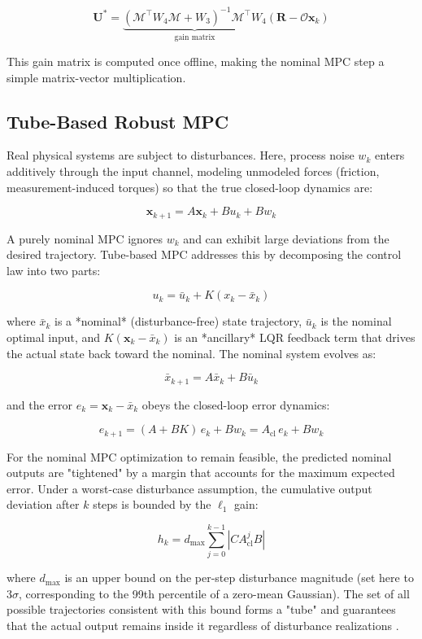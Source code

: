 \documentclass[11pt]{article}
\begin{document}
$$\mathbf{U}^* = \underbrace{({\mathcal{M}}^\top W_4 \mathcal{M} + W_3)^{-1} \mathcal{M}^\top W_4}_{\text{gain matrix}} \left( \mathbf{R} - \mathcal{O}\mathbf{x}_k \right)$$

This gain matrix is computed once offline, making the nominal MPC step a simple matrix-vector multiplication.

\subsection{Tube-Based Robust MPC}
Real physical systems are subject to disturbances. Here, process noise $w_k$ enters additively through the input channel, modeling unmodeled forces (friction, measurement-induced torques) so that the true closed-loop dynamics are:

$$\mathbf{x}_{k+1} = A\mathbf{x}_k + Bu_k + Bw_k$$

A purely nominal MPC ignores $w_k$ and can exhibit large deviations from the desired trajectory. Tube-based MPC addresses this by decomposing the control law into two parts:

$$u_k = \bar{u}_k + K(x_k - \bar{x}_k)$$

where $\bar{x}_k$ is a *nominal* (disturbance-free) state trajectory, $\bar{u}_k$ is the nominal optimal input, and $K(\mathbf{x}_k - \bar{x}_k)$ is an *ancillary* LQR feedback term that drives the actual state back toward the nominal. The nominal system evolves as:

$$\bar{x}_{k+1} = A\bar{x}_k + B\bar{u}_k$$

and the error $e_k = \mathbf{x}_k - \bar{x}_k$ obeys the closed-loop error dynamics:

$$e_{k+1} = (A + BK)\,e_k + Bw_k = A_{\text{cl}}\,e_k + Bw_k$$

For the nominal MPC optimization to remain feasible, the predicted nominal outputs are "tightened" by a margin that accounts for the maximum expected error. Under a worst-case disturbance assumption, the cumulative output deviation after $k$ steps is bounded by the $\ell_1$ gain:

$$h_k = d_{\max} \sum_{j=0}^{k-1} \left| C A_{\text{cl}}^j B \right|$$

where $d_{\max}$ is an upper bound on the per-step disturbance magnitude (set here to $3\sigma$, corresponding to the 99th percentile of a zero-mean Gaussian). The set of all possible trajectories consistent with this bound forms a "tube" and guarantees that the actual output remains inside it regardless of disturbance realizations \cite{dey2026adaptivetubempccommon,LANGSON2004125}.
\end{document}
